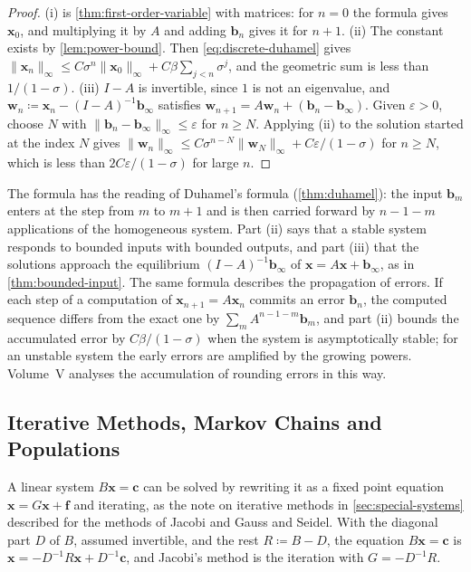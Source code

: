 \begin{proof}
(i) is \cref{thm:first-order-variable} with matrices: for $n=0$ the formula gives $\mathbf x_0$, and multiplying it by $A$ and adding $\mathbf b_n$ gives it for $n+1$. (ii) The constant exists by \cref{lem:power-bound}. Then \eqref{eq:discrete-duhamel} gives $\|\mathbf x_n\|_\infty\le C\sigma^n\|\mathbf x_0\|_\infty+C\beta\sum_{j<n}\sigma^j$, and the geometric sum is less than $1/(1-\sigma)$. (iii) $I-A$ is invertible, since $1$ is not an eigenvalue, and $\mathbf w_n\coloneqq\mathbf x_n-(I-A)^{-1}\mathbf b_\infty$ satisfies $\mathbf w_{n+1}=A\mathbf w_n+(\mathbf b_n-\mathbf b_\infty)$. Given $\varepsilon>0$, choose $N$ with $\|\mathbf b_n-\mathbf b_\infty\|_\infty\le\varepsilon$ for $n\ge N$. Applying (ii) to the solution started at the index $N$ gives $\|\mathbf w_n\|_\infty\le C\sigma^{n-N}\|\mathbf w_N\|_\infty+C\varepsilon/(1-\sigma)$ for $n\ge N$, which is less than $2C\varepsilon/(1-\sigma)$ for large $n$.
\end{proof}

The formula has the reading of Duhamel's formula (\cref{thm:duhamel}): the input $\mathbf b_m$ enters at the step from $m$ to $m+1$ and is then carried forward by $n-1-m$ applications of the homogeneous system. Part (ii) says that a stable system responds to bounded inputs with bounded outputs, and part (iii) that the solutions approach the equilibrium $(I-A)^{-1}\mathbf b_\infty$ of $\mathbf x=A\mathbf x+\mathbf b_\infty$, as in \cref{thm:bounded-input}. The same formula describes the propagation of errors. If each step of a computation of $\mathbf x_{n+1}=A\mathbf x_n$ commits an error $\mathbf b_n$, the computed sequence differs from the exact one by $\sum_mA^{n-1-m}\mathbf b_m$, and part (ii) bounds the accumulated error by $C\beta/(1-\sigma)$ when the system is asymptotically stable; for an unstable system the early errors are amplified by the growing powers. Volume~V analyses the accumulation of rounding errors in this way.

\subsection{Iterative Methods, Markov Chains and Populations}

A linear system $B\mathbf x=\mathbf c$ can be solved by rewriting it as a fixed point equation $\mathbf x=G\mathbf x+\mathbf f$ and iterating, as the note on iterative methods in \cref{sec:special-systems} described for the methods of Jacobi and Gauss and Seidel. With the diagonal part $D$ of $B$, assumed invertible, and the rest $R\coloneqq B-D$, the equation $B\mathbf x=\mathbf c$ is $\mathbf x=-D^{-1}R\mathbf x+D^{-1}\mathbf c$, and Jacobi's method is the iteration with $G=-D^{-1}R$.

